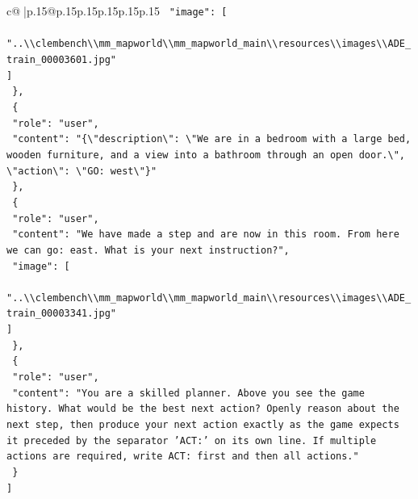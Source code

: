 \documentclass{article}
\begin{document}
{\begin{supertabular}{c@{$\;$}|p{.15\linewidth}@{}p{.15\linewidth}p{.15\linewidth}p{.15\linewidth}p{.15\linewidth}p{.15\linewidth}}
{{{\texttt{    "image": {[}} \\
\texttt{      "..\textbackslash{}\textbackslash{}clembench\textbackslash{}\textbackslash{}mm\_mapworld\textbackslash{}\textbackslash{}mm\_mapworld\_main\textbackslash{}\textbackslash{}resources\textbackslash{}\textbackslash{}images\textbackslash{}\textbackslash{}ADE\_train\_00003601.jpg"} \\
\texttt{    {]}} \\
\texttt{  \},} \\
\texttt{  \{} \\
\texttt{    "role": "user",} \\
\texttt{    "content": "\{\textbackslash{}"description\textbackslash{}": \textbackslash{}"We are in a bedroom with a large bed, wooden furniture, and a view into a bathroom through an open door.\textbackslash{}", \textbackslash{}"action\textbackslash{}": \textbackslash{}"GO: west\textbackslash{}"\}"} \\
\texttt{  \},} \\
\texttt{  \{} \\
\texttt{    "role": "user",} \\
\texttt{    "content": "We have made a step and are now in this room. From here we can go: east. What is your next instruction?",} \\
\texttt{    "image": {[}} \\
\texttt{      "..\textbackslash{}\textbackslash{}clembench\textbackslash{}\textbackslash{}mm\_mapworld\textbackslash{}\textbackslash{}mm\_mapworld\_main\textbackslash{}\textbackslash{}resources\textbackslash{}\textbackslash{}images\textbackslash{}\textbackslash{}ADE\_train\_00003341.jpg"} \\
\texttt{    {]}} \\
\texttt{  \},} \\
\texttt{  \{} \\
\texttt{    "role": "user",} \\
\texttt{    "content": "You are a skilled planner. Above you see the game history. What would be the best next action? Openly reason about the next step, then produce your next action exactly as the game expects it preceded by the separator 'ACT:' on its own line. If multiple actions are required, write ACT: first and then all actions."} \\
\texttt{  \}} \\
\texttt{{]}} \\
            }
        }
    }
     \\ \\


\end{supertabular}}
\end{document}
